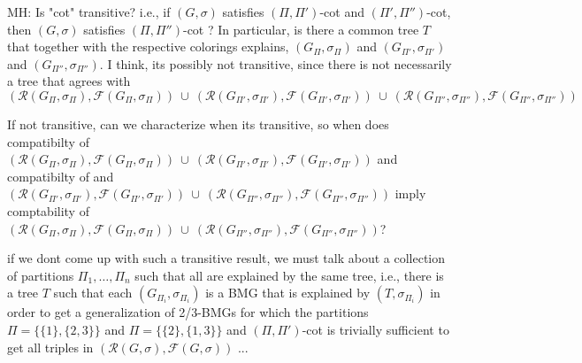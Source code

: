 \documentclass[final,3p,times]{elsarticle}
\newtheorem{lemma}[theorem]{Lemma}%
\newcommand{\TODO}[1]{\begingroup\color{red}#1\endgroup}
\begin{document}
\TODO{MH: Is "cot" transitive? i.e., if $(G,\sigma)$ satisfies $(\Pi,\Pi')$-cot and $(\Pi',\Pi'')$-cot, then 
		$(G,\sigma)$ satisfies $(\Pi,\Pi'')$-cot ? In particular, 
		is there a common tree $T$ that together with the respective colorings explains, 
		$(G_{\Pi},\sigma_{\Pi})$ 
		and $(G_{\Pi'},\sigma_{\Pi'})$ and
		$(G_{\Pi''},\sigma_{\Pi''})$. I think, its possibly not transitive,  since
		there is not necessarily a tree that agrees with
		$$(\mathscr{R}(G_{\Pi},\sigma_{\Pi}),\mathscr{F}(G_{\Pi},\sigma_{\Pi}))\ \cup\ 
		(\mathscr{R}(G_{\Pi'},\sigma_{\Pi'}),\mathscr{F}(G_{\Pi'},\sigma_{\Pi'}))\ \cup\ 
		(\mathscr{R}(G_{\Pi''},\sigma_{\Pi''}),\mathscr{F}(G_{\Pi''},\sigma_{\Pi''}))$$
		


If not transitive, can we characterize when its transitive, so when 
does compatibilty of  $(\mathscr{R}(G_{\Pi},\sigma_{\Pi}),\mathscr{F}(G_{\Pi},\sigma_{\Pi}))\ \cup\ 
		(\mathscr{R}(G_{\Pi'},\sigma_{\Pi'}),\mathscr{F}(G_{\Pi'},\sigma_{\Pi'}))$
		and compatibilty of 
		and $
		(\mathscr{R}(G_{\Pi'},\sigma_{\Pi'}),\mathscr{F}(G_{\Pi'},\sigma_{\Pi'}))\ \cup\ 
		(\mathscr{R}(G_{\Pi''},\sigma_{\Pi''}),\mathscr{F}(G_{\Pi''},\sigma_{\Pi''}))$
		imply comptability of 
		$(\mathscr{R}(G_{\Pi},\sigma_{\Pi}),\mathscr{F}(G_{\Pi},\sigma_{\Pi}))\ \cup\ 
		(\mathscr{R}(G_{\Pi''},\sigma_{\Pi''}),\mathscr{F}(G_{\Pi''},\sigma_{\Pi''}))$?
		

if we dont come up with such a transitive result, 
we must talk about a collection of partitions $\Pi_1,\dots,\Pi_n$
such that all are explained by the same tree, i.e.,  there is a tree $T$ such
that each $(G_{\Pi_i},\sigma_{\Pi_i})$ is a BMG that is explained by $(T,\sigma_{\Pi_i})$
in order to get a generalization of 2/3-BMGs for which 
the partitions $\Pi = \{\{1\}, \{2,3\}\}$ and  $\Pi = \{\{2\}, \{1,3\}\}$ 
and $(\Pi,\Pi')$-cot is trivially sufficient to get all triples
in $(\mathscr{R}(G,\sigma),\mathscr{F}(G,\sigma))$ ... 
}	 
	 

\end{document}
